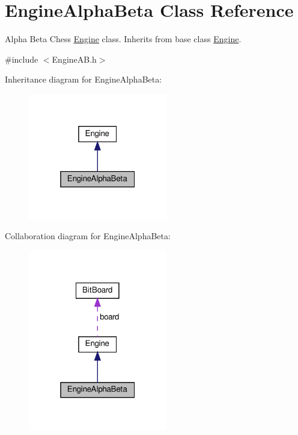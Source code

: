 \hypertarget{classEngineAlphaBeta}{}\section{Engine\+Alpha\+Beta Class Reference}
\label{classEngineAlphaBeta}


Alpha Beta Chess \hyperlink{classEngine}{Engine} class. Inherits from base class \hyperlink{classEngine}{Engine}.  




{\ttfamily \#include $<$Engine\+A\+B.\+h$>$}



Inheritance diagram for Engine\+Alpha\+Beta\+:\nopagebreak
\begin{figure}[H]
\begin{center}
\leavevmode
\includegraphics[width=172pt]{classEngineAlphaBeta__inherit__graph}
\end{center}
\end{figure}


Collaboration diagram for Engine\+Alpha\+Beta\+:\nopagebreak
\begin{figure}[H]
\begin{center}
\leavevmode
\includegraphics[width=172pt]{classEngineAlphaBeta__coll__graph}
\end{center}
\end{figure}
